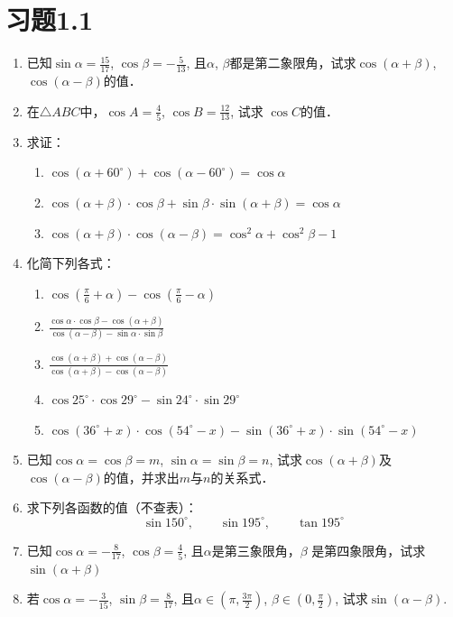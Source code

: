 \section*{习题1.1}
\begin{enumerate}
\item 已知$\sin\alpha=\frac{15}{17}$, $\cos\beta=-\frac{5}{13}$, 且$\alpha$, $\beta$都是第二象限角，试求$\cos(\alpha+\beta)$, $\cos(\alpha-\beta)$的值．
\item 在$\triangle ABC$中，$\cos A=\frac{4}{5}$, $\cos B=\frac{12}{13}$, 试求 $\cos C$的值．
\item 求证：
\begin{enumerate}
    \item $\cos (\alpha+60^{\circ}) +\cos (\alpha-60^{\circ}) =\cos\alpha$
    \item $\cos (\alpha+\beta)\cdot \cos\beta+\sin\beta\cdot \sin(\alpha+\beta) =\cos\alpha$
    \item $\cos (\alpha+\beta)\cdot \cos (\alpha-\beta) =\cos^2\alpha+\cos^2\beta-1$
\end{enumerate}
\item 化简下列各式：
\begin{enumerate}
    \item $\cos\left(\frac{\pi}{6}+\alpha\right)-\cos\left(\frac{\pi}{6}-\alpha\right)$
    \item $\frac{\cos\alpha\cdot \cos\beta-\cos (\alpha+\beta)}{\cos (\alpha-\beta)-\sin\alpha\cdot \sin\beta}$
    \item $\frac{\cos (\alpha+\beta)+\cos(\alpha-\beta)}{\cos (\alpha+\beta)-\cos (\alpha-\beta)}$
    \item $\cos25^{\circ}\cdot \cos29^{\circ}-\sin24^{\circ}\cdot \sin29^{\circ}$
    \item $\cos (36^{\circ}+x)\cdot \cos (54^{\circ}-x)-\sin (36^{\circ}+x)\cdot \sin (54^{\circ}-x)$
\end{enumerate} 

\item 已知$\cos\alpha=\cos\beta=m$, $\sin\alpha=\sin\beta=n$, 试求$\cos(\alpha+\beta)$及$\cos(\alpha-\beta)$的值，并求出$m$与$n$的关系式．
\item 求下列各函数的值（不查表）：
\[\sin150^{\circ},\qquad \sin195^{\circ},\qquad \tan 195^{\circ}\]
\item 已知$\cos\alpha=-\frac{8}{17}$, $\cos\beta=\frac{4}{5}$,
且$\alpha$是第三象限角，$\beta$
是第四象限角，试求$\sin(\alpha+\beta)$

\item 若$\cos\alpha=-\frac{3}{15}$, $\sin\beta=\frac{8}{17}$, 且$\alpha\in\left(\pi,\frac{3\pi}{2}\right)$,
$\beta\in \left(0,\frac{\pi}{2}\right)$, 试求$\sin(\alpha-\beta)$.



\end{enumerate}
